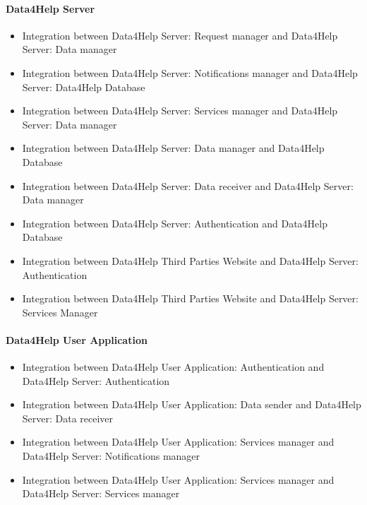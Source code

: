 \documentclass[../DD.tex]{subfiles}
\begin{document}
		\paragraph{Data4Help Server}
		\begin{itemize}
			\item{Integration between Data4Help Server: Request manager and Data4Help Server: Data manager}
			\item{Integration between Data4Help Server: Notifications manager and Data4Help Server: Data4Help Database}
			\item{Integration between Data4Help Server: Services manager and Data4Help Server: Data manager}
			\item{Integration between Data4Help Server: Data manager and Data4Help Database}
			\item{Integration between Data4Help Server: Data receiver and Data4Help Server: Data manager}
			\item{Integration between Data4Help Server: Authentication and Data4Help Database}
			\item{Integration between Data4Help Third Parties Website and Data4Help Server: Authentication}
			\item{Integration between Data4Help Third Parties Website and Data4Help Server: Services Manager}
		\end{itemize}

		\paragraph{Data4Help User Application}
		\begin{itemize}
			\item{Integration between Data4Help User Application: Authentication and Data4Help Server: Authentication}
			\item{Integration between Data4Help User Application: Data sender and Data4Help Server: Data receiver}
			\item{Integration between Data4Help User Application: Services manager and Data4Help Server: Notifications manager}
			\item{Integration between Data4Help User Application: Services manager and Data4Help Server: Services manager}
		\end{itemize}
\end{document}
